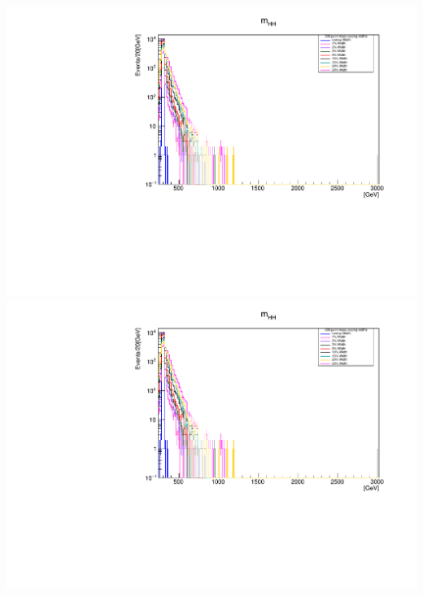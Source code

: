 \documentclass[a4wide,10pt]{article}
\begin{document}
\includegraphics[scale=0.50,page=19]{../Pdfs/diH_InvariantMass_VaryingWidths.pdf}
\includegraphics[scale=0.50,page=20]{../Pdfs/diH_InvariantMass_VaryingWidths.pdf}
\end{document}
